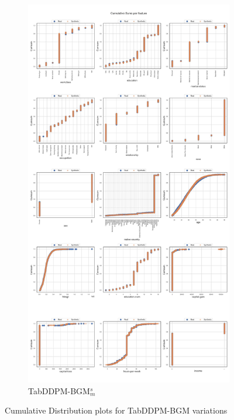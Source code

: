 \begin{landscape}
\begin{figure}[h]
\begin{subfigure}{0.3\linewidth}
			\includegraphics[height=\textheight,width=\linewidth,keepaspectratio]{images/cumsums/tab-ddpm-bgm-simTune-minmax.jpg}
			\caption{TabDDPM-BGM$^{s}_m$}
		\end{subfigure}
		\caption{Cumulative Distribution plots for TabDDPM-BGM variations}
		\label{fig_a:cumsum_4}
	\end{figure}
\end{landscape}
